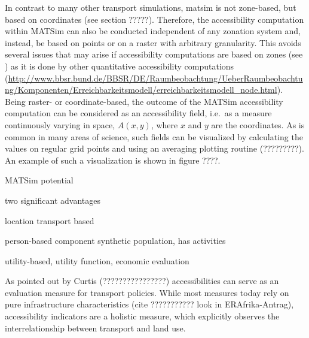 In contrast to many other transport simulations, \gls{matsim} is not zone-based, but based on coordinates (see section ?????). Therefore, the accessibility computation within MATSim can also be conducted independent of any zonation system and, instead, be based on points or on a raster with arbitrary granularity. This avoids several issues that may arise if accessibility computations are based on zones (see \citep[e.g.,][]{NicolaiNagel2012HiResAccessibilityMethodInBook}) as it is done by other quantitative accessibility computations 
%
%
(\url{http://www.bbsr.bund.de/BBSR/DE/Raumbeobachtung/UeberRaumbeobachtung/Komponenten/Erreichbarkeitsmodell/erreichbarkeitsmodell_node.html}). Being raster- or coordinate-based, the outcome of the MATSim accessibility computation can be considered as an accessibility field,
i.e.\ as a measure continuously varying in space, $A(x,y)$, where $x$ and $y$
are the coordinates. As is common in many areas of science, such
fields can be visualized by calculating the values on regular grid
points and using an averaging plotting routine (?????????). An example of such a visualization is shown in figure ????.

MATSim potential

two significant advantages

location transport based

person-based component synthetic population, has activities

utility-based, utility function, economic evaluation




As pointed out by Curtis (????????????????) accessibilities can serve as an evaluation measure for transport policies. While most measures today rely on pure infrastructure characteristics (cite ??????????? look in ERAfrika-Antrag), accessibility indicators are a holistic measure, which explicitly observes the interrelationship between transport and land use.

